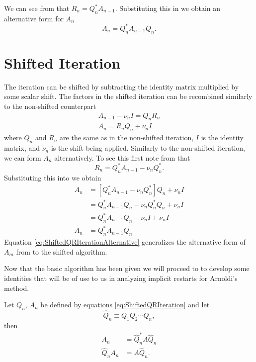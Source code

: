 We can see from  that $R_n = Q_n^*A_{n-1}$.  Substituting this in  we obtain an alternative form for $A_n$
\begin{equation}
    A_{n} = Q_n^*A_{n-1}Q_n.
    \label{eq:QRIterationAlternate}
\end{equation}

\section*{Shifted \QR Iteration} \label{sec:ShiftedQR}
The \QR iteration can be shifted by subtracting the identity matrix multiplied by some scalar shift.  The factors in the shifted \QR iteration can be recombined similarly to the non-shifted counterpart
\begin{subequations}
    \label{eq:ShiftedQRIteration}
\begin{gather}
    A_{n-1} - \nu_n I = Q_nR_n \label{eq:ShiftedQRDecomposition} \\
    A_n = R_nQ_n + \nu_nI \label{eq:ShiftedQRRecombine}
\end{gather}
\end{subequations}
where $Q_n$ and $R_n$ are the same as in the non-shifted \QR iteration, $I$ is the identity matrix, and $\nu_n$ is the shift being applied.  Similarly to the non-shifted \QR iteration, we can form $A_n$ alternatively.  To see this first note from  that \[R_n = Q_n^*A_{n-1} - \nu_nQ_n^*.\]  Substituting this into  we obtain
\begin{equation}
    \begin{split}
        A_n &= \left[ Q_n^*A_{n-1} - \nu_nQ_n^* \right]Q_n + \nu_nI \\
         &= Q_n^*A_{n-1}Q_n - \nu_nQ_n^*Q_n + \nu_nI \\
         &= Q_n^*A_{n-1}Q_n - \nu_nI + \nu_nI \\
         A_n &= Q_n^*A_{n-1}Q_n
    \end{split}
    \label{eq:ShiftedQRIterationAlternative}
\end{equation}
Equation \eqref{eq:ShiftedQRIterationAlternative} generalizes the alternative form of $A_m$ from  to the shifted \QR algorithm.  

Now that the basic \QR algorithm has been given we will proceed to to develop some identities that will be of use to us in analyzing implicit restarts for Arnoldi's method.
\begin{lem} 
    Let $Q_n$, $A_n$ be defined by equations \eqref{eq:ShiftedQRIteration} and let
\begin{equation}
    \hat{Q}_n \equiv Q_1Q_2\cdots Q_n,
    \label{eq:QhatDefined}
\end{equation}
then
\begin{align}
    A_n &= \hat{Q}_n^*A\hat{Q}_n  \label{eq:QRRecombined} \\
    \hat{Q}_nA_n &= A\hat{Q}_n. \label{eq:QnAn}
\end{align}
\label{lem:QRRecombined}
\end{lem}


